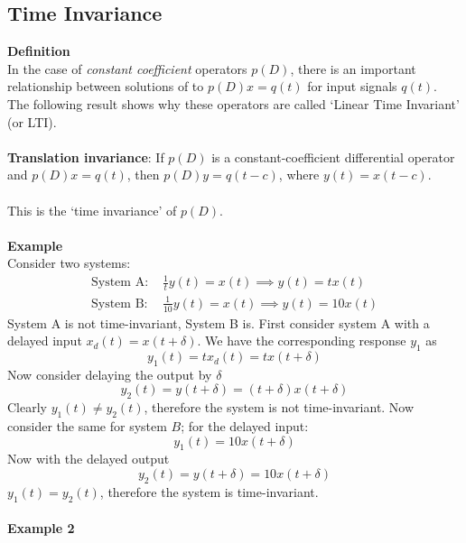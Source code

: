 \documentclass{report}
\begin{document}
\subsection{Time Invariance}
\textbf{Definition}\\
In the case of \textit{constant coefficient} operators $p(D)$, there is an important 
relationship between solutions of to $p(D)x=q(t)$ for input signals $q(t)$. The following result shows why these
operators are called `Linear Time Invariant' (or LTI).\\
\vspace{1mm}\\
\textbf{Translation invariance}: If $p(D)$ is a constant-coefficient differential operator and $p(D)x=q(t)$,
then $p(D)y=q(t-c)$, where $y(t)=x(t-c)$.\\
\vspace{1mm}\\
This is the `time invariance' of $p(D)$.\\
\vspace{1mm}\\
\textbf{Example}\\
Consider two systems:
\begin{align*}
\text{System A: }&\frac{1}{t}y(t)=x(t)\implies y(t)=tx(t)\\
\text{System B: }&\frac{1}{10}y(t)=x(t)\implies y(t)=10x(t)
\end{align*}
System A is not time-invariant, System B is. First consider system A with a delayed input $x_d(t)=x(t+\delta)$.
We have the corresponding response $y_1$ as
\begin{equation*}
y_1(t)=tx_d(t)=tx(t+\delta)
\end{equation*}
Now consider delaying the output by $\delta$
\begin{equation*}
y_2(t)=y(t+\delta)=(t+\delta)x(t+\delta)
\end{equation*}
Clearly $y_1(t)\neq y_2(t)$, therefore the system is not time-invariant. Now consider the same for system $B$;
for the delayed input:
\begin{equation*}
y_1(t)=10x(t+\delta)
\end{equation*}
Now with the delayed output
\begin{equation*}
y_2(t)=y(t+\delta)=10x(t+\delta)
\end{equation*}
$y_1(t)=y_2(t)$, therefore the system is time-invariant.\\
\vspace{1mm}\\
\textbf{Example 2}\\
\end{document}

